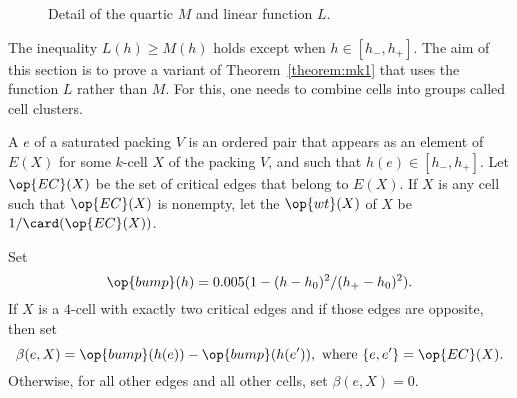 \begin{figure}[htb]
\centering
{}
\caption{Detail of the quartic $M$ and linear function $L$.}
\label{fig:L}
\end{figure}

The inequality $L(h)\ge M(h)$ holds except when $h\in [h_-,h_+]$.  The
aim of this section is to prove a variant of Theorem~\ref{theorem:mk1}
that uses the function $L$ rather than $M$.  For this, one needs to
combine cells into groups called cell clusters.

\begin{definition}\label{def:wt} 
A  $e$ of a saturated packing $V$ is an ordered pair
that appears as an element of $E(X)$ for some 
$k$-cell $X$ of the packing $V$, and such that
$h(e)\in[h_-,h_+]$.  Let $\op{EC}(X)$ 
be the set of critical edges that belong to $E(X)$.  If $X$ is any cell such
that $\op{EC}(X)$ is nonempty, let the  $\op{wt}(X)$ of $X$ be
$1/\card(\op{EC}(X))$.
\end{definition}
%
%
%

\begin{definition}\label{def:beta} 
Set 
\begin{displaymath} 
\op{bump}(h) = 0.005 (1 - (h-h_0)^2/(h_+-h_0)^2).
\end{displaymath}
If $X$ is a $4$-cell with exactly two critical edges and if those edges
are opposite, then set
\begin{displaymath} 
\beta(e,X) = \op{bump}(h(e)) - \op{bump}(h(e')), \text{ where } \{e,e'\} = \op{EC}(X).  
\end{displaymath}
Otherwise, for all other edges and all other cells, set $\beta(e,X) = 0$.
\end{definition}
%
%

